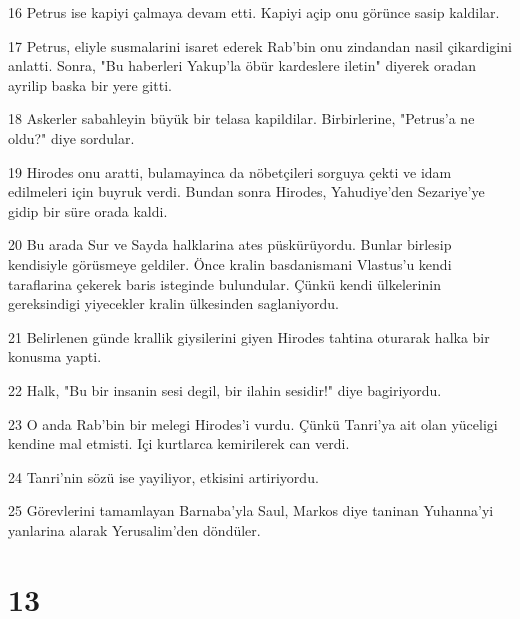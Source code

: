 \par 16 Petrus ise kapiyi çalmaya devam etti. Kapiyi açip onu görünce sasip kaldilar.
\par 17 Petrus, eliyle susmalarini isaret ederek Rab'bin onu zindandan nasil çikardigini anlatti. Sonra, "Bu haberleri Yakup'la öbür kardeslere iletin" diyerek oradan ayrilip baska bir yere gitti.
\par 18 Askerler sabahleyin büyük bir telasa kapildilar. Birbirlerine, "Petrus'a ne oldu?" diye sordular.
\par 19 Hirodes onu aratti, bulamayinca da nöbetçileri sorguya çekti ve idam edilmeleri için buyruk verdi. Bundan sonra Hirodes, Yahudiye'den Sezariye'ye gidip bir süre orada kaldi.
\par 20 Bu arada Sur ve Sayda halklarina ates püskürüyordu. Bunlar birlesip kendisiyle görüsmeye geldiler. Önce kralin basdanismani Vlastus'u kendi taraflarina çekerek baris isteginde bulundular. Çünkü kendi ülkelerinin gereksindigi yiyecekler kralin ülkesinden saglaniyordu.
\par 21 Belirlenen günde krallik giysilerini giyen Hirodes tahtina oturarak halka bir konusma yapti.
\par 22 Halk, "Bu bir insanin sesi degil, bir ilahin sesidir!" diye bagiriyordu.
\par 23 O anda Rab'bin bir melegi Hirodes'i vurdu. Çünkü Tanri'ya ait olan yüceligi kendine mal etmisti. Içi kurtlarca kemirilerek can verdi.
\par 24 Tanri'nin sözü ise yayiliyor, etkisini artiriyordu.
\par 25 Görevlerini tamamlayan Barnaba'yla Saul, Markos diye taninan Yuhanna'yi yanlarina alarak Yerusalim'den döndüler.

\chapter{13}

